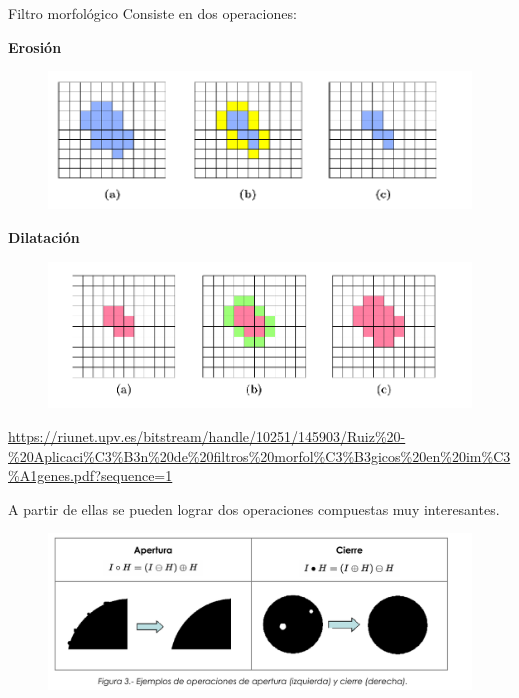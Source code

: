 \documentclass[12pt]{beamer}
\begin{document}
\begin{frame}{Filtro morfológico}
Consiste en dos operaciones:

\textbf{Erosión}
\vspace{0.02cm}
\begin{figure}
    \centering
    \includegraphics[width=0.6\linewidth]{erosion.png}
    
    \label{fig:erosion}
\end{figure}

\textbf{Dilatación}
\begin{figure}
    \centering
    \includegraphics[width=0.6\linewidth]{dilatacion.png}
    
    
    \label{fig:dilatacion}
\end{figure}

\vspace{0.5cm}  %
\tiny
\url{https://riunet.upv.es/bitstream/handle/10251/145903/Ruiz\%20-\%20Aplicaci\%C3\%B3n\%20de\%20filtros\%20morfol\%C3\%B3gicos\%20en\%20im\%C3\%A1genes.pdf?sequence=1}

\end{frame}


\begin{frame}
A partir de ellas se pueden lograr dos operaciones compuestas muy interesantes.\newline
\begin{figure}
    \centering
    \includegraphics[width=\linewidth]{cierre.png}
    
    \label{fig:enter-label}
\end{figure}
\end{frame}
\end{document}
